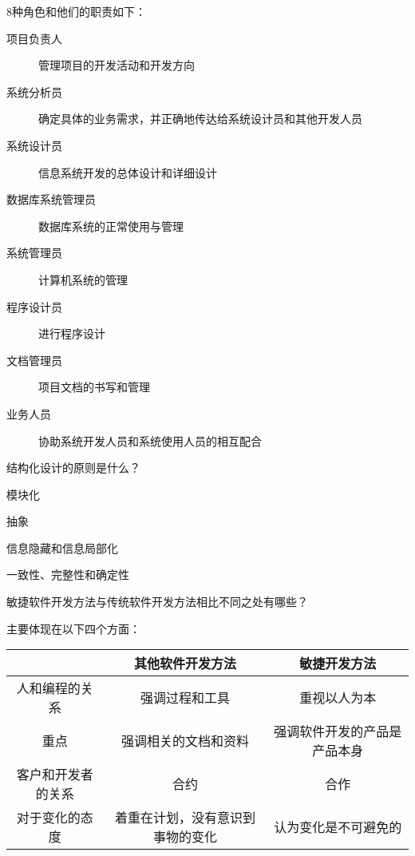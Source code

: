 \documentclass{exam}
\newif\ifprint
\newcommand{\blank}[2][.5cm]{{\makebox[#1][c]{%
			\ifprint
			\phantom{#2}%
			\else
			#2%
			\fi}}}
\begin{document}
\begin{CJK*}{UTF8}{gbsn}
\begin{questions}
	\begin{solution}
		8种角色和他们的职责如下：
		\begin{description}
			\item[项目负责人] 管理项目的开发活动和开发方向
			\item[系统分析员] 确定具体的业务需求，并正确地传达给系统设计员和其他开发人员
			\item[系统设计员] 信息系统开发的总体设计和详细设计
			\item[数据库系统管理员] 数据库系统的正常使用与管理
			\item[系统管理员] 计算机系统的管理
			\item[程序设计员] 进行程序设计
			\item[文档管理员] 项目文档的书写和管理
			\item[业务人员] 协助系统开发人员和系统使用人员的相互配合
		\end{description}
	\end{solution}
	
	\question 结构化设计的原则是什么？ \blank[1cm]{P28-29}
	
	\begin{solution}
		\begin{inparaenum}[ (1)]
			\item 模块化
			\item 抽象
			\item 信息隐藏和信息局部化
			\item 一致性、完整性和确定性
		\end{inparaenum}
	\end{solution}
	
	\question 敏捷软件开发方法与传统软件开发方法相比不同之处有哪些？ \blank{P48}
	
	\begin{solution}
		主要体现在以下四个方面：
		\begin{center}
		\begin{spacing}{1.8}
	    \begin{tabular}{|c|c|c|}
	    	\hline
	    	    &     其他软件开发方法     &     敏捷开发方法     \\
	        \hline
	    	 人和编程的关系  &     强调过程和工具      &     重视以人为本     \\ 
	    	\hline
	    	   重点     &    强调相关的文档和资料    & 强调软件开发的产品是产品本身 \\
	    	   \hline
	    	客户和开发者的关系 &        合约        &       合作       \\ \hline
	    	 对于变化的态度  & 着重在计划，没有意识到事物的变化 &   认为变化是不可避免的   \\ \hline
	    \end{tabular}
    	\end{spacing}
	    \end{center}
	\end{solution}
	

\end{questions}
\end{CJK*}
\end{document}
